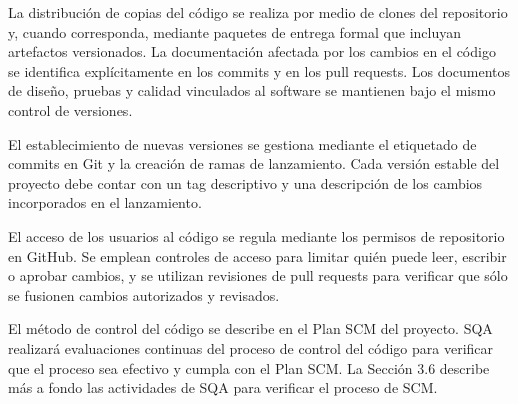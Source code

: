 La distribución de copias del código se realiza por medio de clones del repositorio y, cuando corresponda, mediante paquetes de entrega formal que incluyan artefactos versionados. La documentación afectada por los cambios en el código se identifica explícitamente en los commits y en los pull requests. Los documentos de diseño, pruebas y calidad vinculados al software se mantienen bajo el mismo control de versiones.

El establecimiento de nuevas versiones se gestiona mediante el etiquetado de commits en Git y la creación de ramas de lanzamiento. Cada versión estable del proyecto debe contar con un tag descriptivo y una descripción de los cambios incorporados en el lanzamiento.

El acceso de los usuarios al código se regula mediante los permisos de repositorio en GitHub. Se emplean controles de acceso para limitar quién puede leer, escribir o aprobar cambios, y se utilizan revisiones de pull requests para verificar que sólo se fusionen cambios autorizados y revisados.

El método de control del código se describe en el Plan SCM del proyecto. SQA realizará evaluaciones continuas del proceso de control del código para verificar que el proceso sea efectivo y cumpla con el Plan SCM. La Sección 3.6 describe más a fondo las actividades de SQA para verificar el proceso de SCM.
